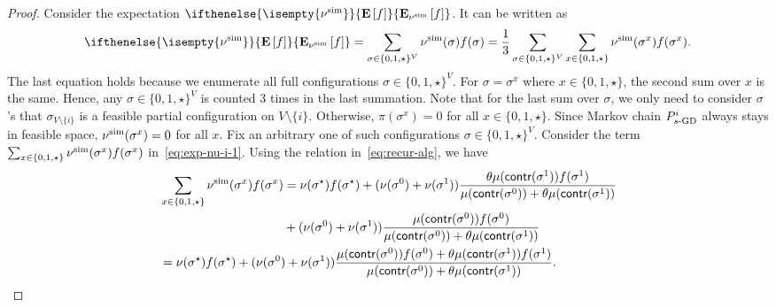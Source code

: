 \documentclass[11pt,a4paper]{article}
\theoremstyle{definition}
\newcommand{\nus}{\nu^{\textnormal{sim}}}
\newcommand{\E}[2][]{ \ifthenelse{\isempty{#1}}
  {\mathbf{\mathbf{E}}\left[#2\right]}
  {\mathbf{\mathbf{E}}_{#1}\left[#2\right]} }
\begin{document}
\begin{proof}
Consider the expectation $\E[\nus]{f}$. It can be written as
\begin{align}\label{eq:exp-nu-i-1}
\E[\nus]{f}=\sum_{\sigma\in \{0,1,\star\}^V} \nus(\sigma)f(\sigma)=\frac{1}{3} \sum_{\sigma\in \{0,1,\star\}^V}\sum_{x\in\{0,1,\star\} } \nus(\sigma^x)f(\sigma^x). 
\end{align}
The last equation holds because we enumerate all full configurations $\sigma \in \{0,1,\star\}^V$. For $\sigma = \sigma^{x}$ where $x\in \{0,1,\star\}$, the second sum over $x$ is the same. Hence, any $\sigma \in \{0,1,\star\}^V$ is counted $3$ times in the last summation.
Note that for the last sum over $\sigma$, we only need to consider $\sigma$'s that $\sigma_{V \setminus \{i\}}$ is a feasible partial configuration on $V \setminus \{i\}$. Otherwise, $\pi(\sigma^x) = 0$ for all $x\in \{0,1,\star\}$. Since Markov chain $P^i_{s\textnormal{-GD}}$ always stays in feasible space, $\nus(\sigma^x) = 0$ for all $x$.
Fix an arbitrary one of such configurations $\sigma \in \{0,1,\star\}^V$. Consider the term $\sum_{x\in \{0,1,\star\}} \nus(\sigma^x)f(\sigma^x)$ in~\eqref{eq:exp-nu-i-1}.
Using the relation in~\eqref{eq:recur-alg}, we have
\begin{align}\label{eq:exp-nu-i}
&\sum_{x\in \{0,1,\star\}} \nus(\sigma^x)f(\sigma^x)= \nu(\sigma^\star) f(\sigma^\star)+(\nu(\sigma^0)+\nu(\sigma^1))\frac{\theta \mu(\textsf{contr}(\sigma^1))f(\sigma^1)}{\mu(\textsf{contr}(\sigma^0))+\theta \mu(\textsf{contr}(\sigma^1))}\notag\\
&\qquad\qquad\qquad\qquad\qquad+(\nu(\sigma^0)+\nu(\sigma^1))\frac{ \mu(\textsf{contr}(\sigma^0))f(\sigma^0)}{\mu(\textsf{contr}(\sigma^0))+\theta \mu(\textsf{contr}(\sigma^1))} \notag\\
&=\nu(\sigma^\star) f(\sigma^\star)+(\nu(\sigma^0)+\nu(\sigma^1))\frac{ \mu(\textsf{contr}(\sigma^0))f(\sigma^0)+\theta \mu(\textsf{contr}(\sigma^1))f(\sigma^1)}{\mu(\textsf{contr}(\sigma^0))+\theta \mu(\textsf{contr}(\sigma^1))}.  
\end{align}


\end{proof}
\end{document}
